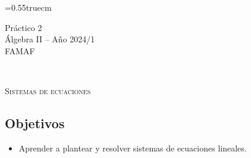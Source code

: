 \documentclass[a4paper,12pt,twoside,spanish,reqno]{amsbook}
\numberwithin{equation}{section}
\begin{document}
    \baselineskip=0.55truecm %
    
    
    {\bf \begin{center} Práctico 2 \\ Álgebra  II -- Año 2024/1 \\ FAMAF \end{center}}

\

\centerline{\textsc{Sistemas de ecuaciones}}

\subsection*{Objetivos}

\begin{itemize}
 \item Aprender a plantear y resolver sistemas de ecuaciones lineales.
\end{itemize}

\smallskip

\bigbreak
\end{document}
